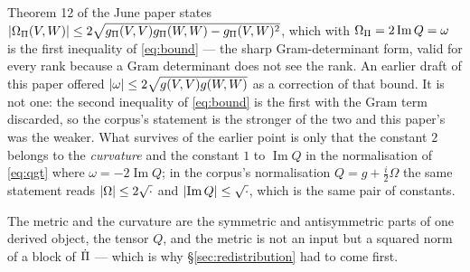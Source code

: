 \begin{remark}
\label{rem:factor2}
Theorem 12 of the June paper \Cc{} \cite{corpus} states
$\lvert\Omega_\Pi(V,W)\rvert\le2\sqrt{g_\Pi(V,V)g_\Pi(W,W)-g_\Pi(V,W)^2}$, which with
$\Omega_\Pi=2\operatorname{Im}Q=\omega$ is the first inequality of \eqref{eq:bound} --- the sharp
Gram-determinant form, valid for every rank because a Gram determinant does not see the rank.
An earlier draft of this paper offered $\lvert\omega\rvert\le2\sqrt{g(V,V)g(W,W)}$ as a correction of
that bound. It is not one: the second inequality of \eqref{eq:bound} is the first with the Gram
term discarded, so the corpus's statement is the stronger of the two and this paper's was the
weaker. What survives of the earlier point is only that the constant $2$ belongs to the
\emph{curvature} and the constant $1$ to $\operatorname{Im}Q$ in the normalisation of
\eqref{eq:qgt} where $\omega=-2\operatorname{Im}Q$; in the corpus's normalisation
$Q=g+\tfrac{i}{2}\Omega$ the same statement reads $\lvert\Omega\rvert\le2\sqrt{\cdot}$ and
$\lvert\operatorname{Im}Q\rvert\le\sqrt{\cdot}$, which is the same pair of constants.
\end{remark}


\begin{remark}
The metric and the curvature are the symmetric and antisymmetric parts of one derived object,
the tensor $Q$, and the metric is not an input but a squared norm of a block of $\dot{\Pi}$ ---
which is why \S\ref{sec:redistribution} had to come first.
\end{remark}
